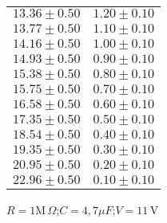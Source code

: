 \documentclass[12pt, letterpaper]{article} %
\theoremstyle{plain} %
\begin{document}
\begin{figure}[H]
\begin{minipage}[t]{0.48\textwidth}
\begin{minipage}[t]{\linewidth}
\begin{tabular}{|c|c|}
$13.36 \pm 0.50$ & $1.20 \pm 0.10$ \\
$13.77 \pm 0.50$ & $1.10 \pm 0.10$ \\
$14.16 \pm 0.50$ & $1.00 \pm 0.10$ \\
$14.93 \pm 0.50$ & $0.90 \pm 0.10$ \\
$15.38 \pm 0.50$ & $0.80 \pm 0.10$ \\
$15.75 \pm 0.50$ & $0.70 \pm 0.10$ \\
$16.58 \pm 0.50$ & $0.60 \pm 0.10$ \\
$17.35 \pm 0.50$ & $0.50 \pm 0.10$ \\
$18.54 \pm 0.50$ & $0.40 \pm 0.10$ \\
$19.35 \pm 0.50$ & $0.30 \pm 0.10$ \\
$20.95 \pm 0.50$ & $0.20 \pm 0.10$ \\
$22.96 \pm 0.50$ & $0.10 \pm 0.10$ \\
\hline
\end{tabular}
\caption*{$R = 1\text{M}\,\Omega$;$C = 4,7\mu F$;$V = 11$\,V}
\end{minipage}


\end{minipage}
\end{figure}
\end{document}
